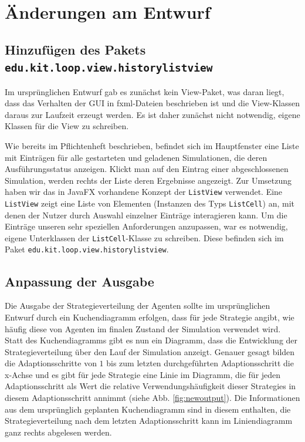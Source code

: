 \documentclass[parskip=full,11pt]{scrartcl}
\begin{document}
\newpage
\section{Änderungen am Entwurf}

\subsection{Hinzufügen des Pakets \texttt{edu.kit.loop.view.historylistview}}
Im ursprünglichen Entwurf gab es zunächst kein View-Paket, was daran liegt, dass das Verhalten der GUI in fxml-Dateien beschrieben ist und die View-Klassen daraus zur Laufzeit erzeugt werden. Es ist daher zunächst nicht notwendig, eigene Klassen für die View zu schreiben.

Wie bereits im Pflichtenheft beschrieben, befindet sich im Hauptfenster eine Liste mit Einträgen für alle gestarteten und geladenen Simulationen, die deren Ausführungsstatus anzeigen. Klickt man auf den Eintrag einer abgeschlossenen Simulation, werden rechts der Liste deren Ergebnisse angezeigt. Zur Umsetzung haben wir das in JavaFX vorhandene Konzept der \texttt{ListView} verwendet. Eine \texttt{ListView} zeigt eine Liste von Elementen (Instanzen des Typs \texttt{ListCell}) an, mit denen der Nutzer durch Auswahl einzelner Einträge interagieren kann. Um die Einträge unseren sehr speziellen Anforderungen anzupassen, war es notwendig, eigene Unterklassen der \texttt{ListCell}-Klasse zu schreiben. Diese befinden sich im Paket \texttt{edu.kit.loop.view.historylistview}.

\subsection{Anpassung der Ausgabe}\label{outputmod}
Die Ausgabe der Strategieverteilung der Agenten sollte im ursprünglichen Entwurf durch ein Kuchendiagramm erfolgen, dass für jede Strategie angibt, wie häufig diese von Agenten im finalen Zustand der Simulation verwendet wird. Statt des Kuchendiagramms gibt es nun ein Diagramm, dass die Entwicklung der Strategieverteilung über den Lauf der Simulation anzeigt. Genauer gesagt bilden die Adaptionsschritte von \(1\) bis zum letzten durchgeführten Adaptionsschritt die x-Achse und es gibt für jede Strategie eine Linie im Diagramm, die für jeden Adaptionsschritt als Wert die relative Verwendungshäufigkeit dieser Strategies in diesem Adaptionsschritt annimmt (siehe Abb. \ref{fig:newoutput}). Die Informationen aus dem ursprünglich geplanten Kuchendiagramm sind in diesem enthalten, die Strategieverteilung nach dem letzten Adaptionsschritt kann im Liniendiagramm ganz rechts abgelesen werden.
\end{document}
